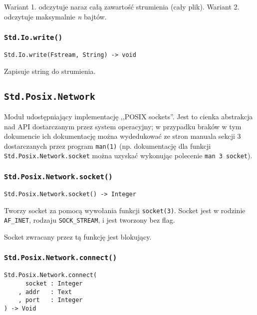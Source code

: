 Wariant 1. odczytuje naraz całą zawartość strumienia (cały plik).
Wariant 2. odczytuje maksymalnie \emph{n} bajtów.

\subsubsection{\texttt{Std.Io.write()}}

\begin{small}
\begin{lstlisting}
Std.Io.write(Fstream, String) -> void
\end{lstlisting}
\end{small}

Zapisuje string do strumienia.

\subsection{\texttt{Std.Posix.Network}}
\label{stdlib_Std_Posix_Network}

Moduł udostępniający implementację ,,POSIX sockets''. Jest to cienka abstrakcja nad API dostarczanym przez
system operacyjny; w przypadku braków w tym dokumencie ich dokumentację można wydedukować ze stron manuala
sekcji 3 dostarczanych przez program \texttt{man(1)} (np. dokumentację dla funkcji
\texttt{Std.Posix.Network.socket} można uzyskać wykonując polecenie \texttt{man 3 socket}).

\subsubsection{\texttt{Std.Posix.Network.socket()}}

\begin{small}
\begin{lstlisting}
Std.Posix.Network.socket() -> Integer
\end{lstlisting}
\end{small}

Tworzy socket za pomocą wywołania funkcji \texttt{socket(3)}.
Socket jest w rodzinie \texttt{AF\_INET}, rodzaju \texttt{SOCK\_STREAM}, i jest tworzony bez flag.

Socket zwracany przez tą funkcję jest blokujący.

\subsubsection{\texttt{Std.Posix.Network.connect()}}

\begin{small}
\begin{lstlisting}
Std.Posix.Network.connect(
      socket : Integer
    , addr   : Text
    , port   : Integer
) -> Void
\end{lstlisting}
\end{small}

